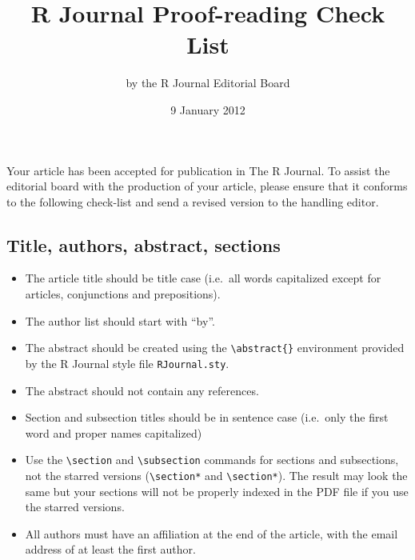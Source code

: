 \documentclass[11pt]{article}
\begin{document}
\title{R Journal Proof-reading Check List}
\author{by the R Journal Editorial Board}
\date{9 January 2012}
\maketitle

Your article has been accepted for publication in The R Journal. To
assist the editorial board with the production of your article, please
ensure that it conforms to the following check-list and send a revised
version to the handling editor.

\subsection*{Title, authors, abstract, sections}
\begin{itemize}
\item The article title should be title case (i.e.\ all words capitalized
   except for articles, conjunctions and prepositions).
\item The author list should start with ``by''.
\item The abstract should be created using the \verb+\abstract{}+
   environment provided by the R Journal style file \texttt{RJournal.sty}.
\item The abstract should not contain any references.
\item  Section and subsection titles should be in sentence case (i.e.\ only
   the first word and proper names capitalized)
\item Use the \verb+\section+ and \verb+\subsection+ commands for sections and 
      subsections, not the starred versions (\verb+\section*+
      and \verb+\section*+). The result may look the same but your
      sections will not be properly indexed in the PDF file if you use
      the starred versions.
\item All authors must have an affiliation at the end of the article,
      with the email address of at least the first author.
\end{itemize}
\end{document}
